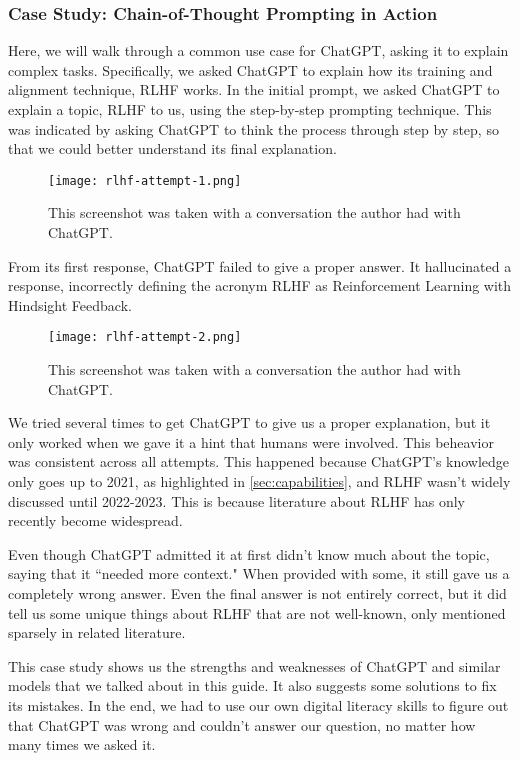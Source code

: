 \documentclass[12pt]{article}
\begin{document}
\subsubsection{Case Study: Chain-of-Thought Prompting in Action}
Here, we will walk through a common use case for ChatGPT, asking it to explain complex tasks. Specifically, we asked ChatGPT to explain how its training and alignment technique, RLHF works. 
In the initial prompt, we asked ChatGPT to explain a topic, RLHF to us, using the step-by-step prompting technique. This was indicated by asking ChatGPT to think the process through step by step, so that we could better understand its final explanation.
\begin{figure}[H]
  \centering
  \texttt{[image: rlhf-attempt-1.png]}
  \caption{This screenshot was taken with a conversation the author had with ChatGPT.}
  \label{fig:biased code snippet}
\end{figure}

From its first response, ChatGPT failed to give a proper answer. It hallucinated a response, incorrectly defining the acronym RLHF as Reinforcement Learning with Hindsight Feedback. 

\begin{figure}[H]
  \centering
  \texttt{[image: rlhf-attempt-2.png]}
  \caption{This screenshot was taken with a conversation the author had with ChatGPT.}
  \label{fig:biased code snippet2}
\end{figure}

We tried several times to get ChatGPT to give us a proper explanation, but it only worked when we gave it a hint that humans were involved. This beheavior was consistent across all attempts. This happened because ChatGPT's knowledge only goes up to 2021, as highlighted in \ref{sec:capabilities}, and RLHF wasn't widely discussed until 2022-2023. This is because literature about RLHF has only recently become widespread. 

Even though ChatGPT admitted it at first didn't know much about the topic, saying that it ``needed more context." When provided with some, it still gave us a completely wrong answer. Even the final answer is not entirely correct, but it did tell us some unique things about RLHF that are not well-known, only mentioned sparsely in related literature.

This case study shows us the strengths and weaknesses of ChatGPT and similar models that we talked about in this guide. It also suggests some solutions to fix its mistakes. In the end, we had to use our own digital literacy skills to figure out that ChatGPT was wrong and couldn't answer our question, no matter how many times we asked it.
\end{document}
